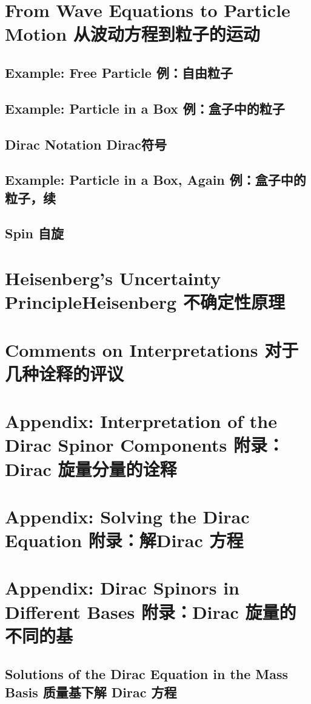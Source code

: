 \section[从波动方程到粒子的运动]{From Wave Equations to Particle Motion 从波动方程到粒子的运动}\label{sec8.5}
\subsection[例：自由粒子]{Example: Free Particle 例：自由粒子}\label{sec8.5.1}
\subsection[例：盒子中的粒子]{Example: Particle in a Box 例：盒子中的粒子}\label{sec8.5.2}
\subsection[Dirac符号]{Dirac Notation Dirac符号}\label{sec8.5.3}
\subsection[例：盒子中的粒子，续]{Example: Particle in a Box, Again 例：盒子中的粒子，续}\label{sec8.5.4}
\subsection[自旋]{Spin 自旋}\label{sec8.5.5}
\section[Heisenberg 不确定性原理]{Heisenberg’s Uncertainty PrincipleHeisenberg 不确定性原理}\label{sec8.6}
\section[对于几种诠释的评议]{Comments on Interpretations 对于几种诠释的评议}\label{sec8.7}
\section[附录：Dirac 旋量分量的诠释]{Appendix: Interpretation of the Dirac Spinor Components 附录：Dirac 旋量分量的诠释}\label{sec8.8}
\section[附录：解Dirac 方程]{Appendix: Solving the Dirac Equation 附录：解Dirac 方程}\label{sec8.9}
\section[附录：Dirac 旋量的不同的基]{Appendix: Dirac Spinors in Different Bases 附录：Dirac 旋量的不同的基}\label{sec8.10}
\subsection[质量基下解 Dirac 方程]{Solutions of the Dirac Equation in the Mass Basis 质量基下解 Dirac 方程}\label{sec8.10.1}